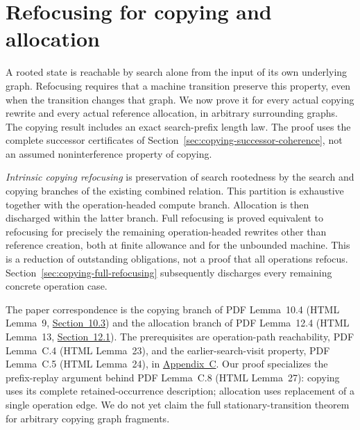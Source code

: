 \clearpage
\section{Refocusing for copying and allocation}
\label{sec:copying-intrinsic-refocusing}
A rooted state is reachable by search alone from the input of its own
underlying graph. Refocusing requires that a machine transition preserve this
property, even when the transition changes that graph. We now prove it for
every actual copying rewrite and every actual reference allocation, in arbitrary
surrounding graphs. The copying result includes an exact search-prefix length
law. The proof uses the complete successor certificates of
Section~\ref{sec:copying-successor-coherence}, not an assumed noninterference
property of copying.

\emph{Intrinsic copying refocusing} is preservation of search rootedness by the
search and copying branches of the existing combined relation. This partition
is exhaustive together with the operation-headed compute branch. Allocation
is then discharged within the latter branch. Full refocusing is proved
equivalent to refocusing for precisely the remaining operation-headed rewrites
other than reference creation, both at finite allowance and for the unbounded
machine. This is a reduction of outstanding obligations, not a proof that all
operations refocus. Section~\ref{sec:copying-full-refocusing} subsequently
discharges every remaining concrete operation case.

The paper correspondence is the copying branch of PDF Lemma~10.4
(HTML Lemma~9, \href{https://arxiv.org/html/1907.01257v5\#S10.SS3}{Section~10.3})
and the allocation branch of PDF Lemma~12.4 (HTML Lemma~13,
\href{https://arxiv.org/html/1907.01257v5\#S12.SS1}{Section~12.1}).
The prerequisites are operation-path reachability, PDF Lemma~C.4
(HTML Lemma~23), and the earlier-search-visit property, PDF Lemma~C.5
(HTML Lemma~24), in \href{https://arxiv.org/html/1907.01257v5\#A3}{Appendix~C}.
Our proof specializes the prefix-replay argument behind PDF Lemma~C.8
(HTML Lemma~27): copying uses its complete retained-occurrence description;
allocation uses replacement of a single operation edge. We do not yet claim
the full stationary-transition theorem for arbitrary copying graph fragments.

